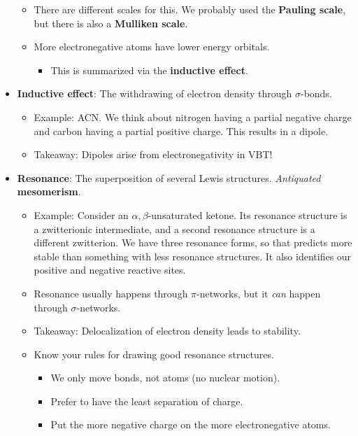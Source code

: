 \documentclass[../notes.tex]{subfiles}
\begin{document}
\begin{itemize}
\begin{itemize}
        \item There are different scales for this. We probably used the \textbf{Pauling scale}, but there is also a \textbf{Mulliken scale}.
        \item More electronegative atoms have lower energy orbitals.
        \begin{itemize}
            \item This is summarized via the \textbf{inductive effect}.
        \end{itemize}
    \end{itemize}
    \item \textbf{Inductive effect}: The withdrawing of electron density through $\sigma$-bonds.
    \begin{itemize}
        \item Example: ACN. We think about nitrogen having a partial negative charge and carbon having a partial positive charge. This results in a dipole.
        \item Takeaway: Dipoles arise from electronegativity in VBT!
    \end{itemize}
    \item \textbf{Resonance}: The superposition of several Lewis structures. \emph{Antiquated} \textbf{mesomerism}.
    \begin{itemize}
        \item Example: Consider an $\alpha,\beta$-unsaturated ketone. Its resonance structure is a zwitterionic intermediate, and a second resonance structure is a different zwitterion. We have three resonance forms, so that predicts more stable than something with less resonance structures. It also identifies our positive and negative reactive sites.
        \item Resonance usually happens through $\pi$-networks, but it \emph{can} happen through $\sigma$-networks.
        \item Takeaway: Delocalization of electron density leads to stability.
        \item Know your rules for drawing good resonance structures.
        \begin{itemize}
            \item We only move bonds, not atoms (no nuclear motion).
            \item Prefer to have the least separation of charge.
            \item Put the more negative charge on the more electronegative atoms.
        \end{itemize}

\end{itemize}
\end{itemize}
\end{document}
